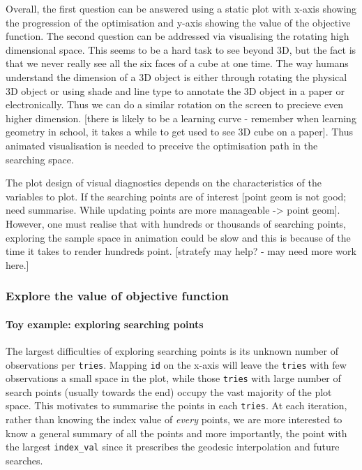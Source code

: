 \documentclass[12pt]{article}
\begin{document}
Overall, the first question can be answered using a static plot with
x-axis showing the progression of the optimisation and y-axis showing
the value of the objective function. The second question can be
addressed via visualising the rotating high dimensional space. This
seems to be a hard task to see beyond 3D, but the fact is that we never
really see all the six faces of a cube at one time. The way humans
understand the dimension of a 3D object is either through rotating the
physical 3D object or using shade and line type to annotate the 3D
object in a paper or electronically. Thus we can do a similar rotation
on the screen to precieve even higher dimension. {[}there is likely to
be a learning curve - remember when learning geometry in school, it
takes a while to get used to see 3D cube on a paper{]}. Thus animated
visualisation is needed to preceive the optimisation path in the
searching space.

The plot design of visual diagnostics depends on the characteristics of
the variables to plot. If the searching points are of interest {[}point
geom is not good; need summarise. While updating points are more
manageable -\textgreater{} point geom{]}. However, one must realise that
with hundreds or thousands of searching points, exploring the sample
space in animation could be slow and this is because of the time it
takes to render hundreds point. {[}stratefy may help? - may need more
work here.{]}

\hypertarget{static}{%
\subsubsection{Explore the value of objective function}\label{static}}

\hypertarget{toy-example-exploring-searching-points}{%
\paragraph{Toy example: exploring searching
points}\label{toy-example-exploring-searching-points}}

The largest difficulties of exploring searching points is its unknown
number of observations per \texttt{tries}. Mapping \texttt{id} on the
x-axis will leave the \texttt{tries} with few observations a small space
in the plot, while those \texttt{tries} with large number of search
points (usually towards the end) occupy the vast majority of the plot
space. This motivates to summarise the points in each \texttt{tries}. At
each iteration, rather than knowing the index value of \emph{every}
points, we are more interested to know a general summary of all the
points and more importantly, the point with the largest
\texttt{index\_val} since it prescribes the geodesic interpolation and
future searches.
\end{document}
